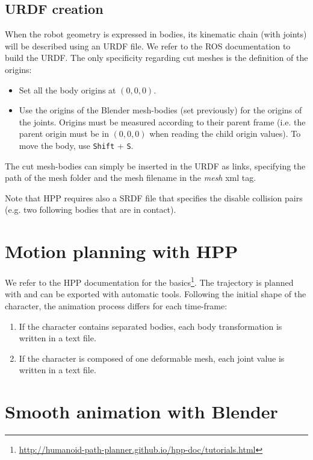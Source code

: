 \documentclass[12pt]{article}
\begin{document}
\subsection{URDF creation}
When the robot geometry is expressed in bodies, its kinematic chain (with joints) will be described using an URDF file. We refer to the ROS documentation to build the URDF.
The only specificity regarding cut meshes is the definition of the origins:
\begin{itemize}
	\item Set all the body origins at $(0,0,0)$.
	\item Use the origins of the Blender mesh-bodies (set previously) for the origins of the joints. Origins must be measured according to their parent frame (i.e. the parent origin must be in $(0,0,0)$ when reading the child origin values). To move the body, use \texttt{Shift} + \texttt{S}.
\end{itemize}
The cut mesh-bodies can simply be inserted in the URDF as links, specifying the path of the mesh folder and the mesh filename in the \textit{mesh} xml tag.

\noindent
Note that HPP requires also a SRDF file that specifies the disable collision pairs (e.g. two following bodies that are in contact).

\section{Motion planning with HPP}
We refer to the HPP documentation for the basics\footnote{\url{http://humanoid-path-planner.github.io/hpp-doc/tutorials.html}}.
The trajectory is planned with and can be exported with automatic tools.
Following the initial shape of the character, the animation process differs for each time-frame:
\begin{enumerate}
	\item If the character contains separated bodies, each body transformation is written in a text file.
	\item If the character is composed of one deformable mesh, each joint value is written in a text file.
\end{enumerate}


\section{Smooth animation with Blender}
\end{document}
